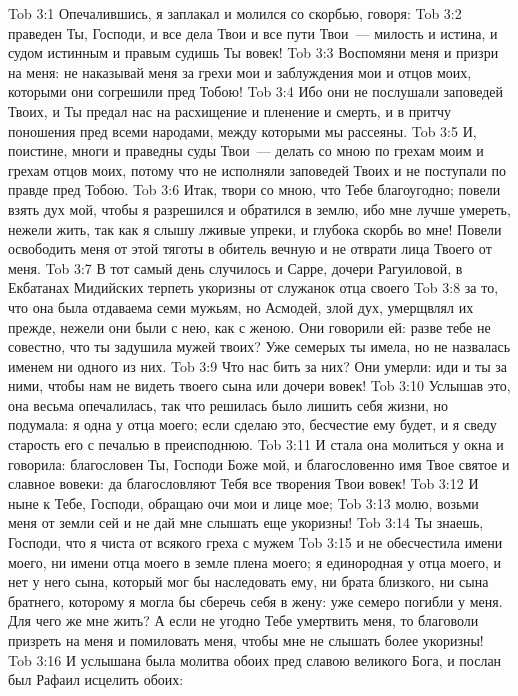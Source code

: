 \vs Tob 3:1 Опечалившись, я заплакал и молился со скорбью, говоря:
\vs Tob 3:2 праведен Ты, Господи, и все дела Твои и все пути Твои~--- милость и истина, и судом истинным и правым судишь Ты вовек!
\vs Tob 3:3 Воспомяни меня и призри на меня: не наказывай меня за грехи мои и заблуждения мои и отцов моих, которыми они согрешили пред Тобою!
\vs Tob 3:4 Ибо они не послушали заповедей Твоих, и Ты предал нас на расхищение и пленение и смерть, и в притчу поношения пред всеми народами, между которыми мы рассеяны.
\vs Tob 3:5 И, поистине, многи и праведны суды Твои~--- делать со мною по грехам моим и грехам отцов моих, потому что не исполняли заповедей Твоих и не поступали по правде пред Тобою.
\vs Tob 3:6 Итак, твори со мною, что Тебе благоугодно; повели взять дух мой, чтобы я разрешился и обратился в землю, ибо мне лучше умереть, нежели жить, так как я слышу лживые упреки, и глубока скорбь во мне! Повели освободить меня от этой тяготы в обитель вечную и не отврати лица Твоего от меня.
\vs Tob 3:7 В тот самый день случилось и Сарре, дочери Рагуиловой, в Екбатанах Мидийских терпеть укоризны от служанок отца своего
\vs Tob 3:8 за то, что она была отдаваема семи мужьям, но Асмодей, злой дух, умерщвлял их прежде, нежели они были с нею, как с женою. Они говорили ей: разве тебе не совестно, что ты задушила мужей твоих? Уже семерых ты имела, но не назвалась именем ни одного из них.
\vs Tob 3:9 Что нас бить за них? Они умерли: иди и ты за ними, чтобы нам не видеть твоего сына или дочери вовек!
\vs Tob 3:10 Услышав это, она весьма опечалилась, так что решилась было лишить себя жизни, но подумала: я одна у отца моего; если сделаю это, бесчестие ему будет, и я сведу старость его с печалью в преисподнюю.
\vs Tob 3:11 И стала она молиться у окна и говорила: благословен Ты, Господи Боже мой, и благословенно имя Твое святое и славное вовеки: да благословляют Тебя все творения Твои вовек!
\vs Tob 3:12 И ныне к Тебе, Господи, обращаю очи мои и лице мое;
\vs Tob 3:13 молю, возьми меня от земли сей и не дай мне слышать еще укоризны!
\vs Tob 3:14 Ты знаешь, Господи, что я чиста от всякого греха с мужем
\vs Tob 3:15 и не обесчестила имени моего, ни имени отца моего в земле плена моего; я единородная у отца моего, и нет у него сына, который мог бы наследовать ему, ни брата близкого, ни сына братнего, которому я могла бы сберечь себя в жену: уже семеро погибли у меня. Для чего же мне жить? А если не угодно Тебе умертвить меня, то благоволи призреть на меня и помиловать меня, чтобы мне не слышать более укоризны!
\vs Tob 3:16 И услышана была молитва обоих пред славою великого Бога, и послан был Рафаил исцелить обоих:
